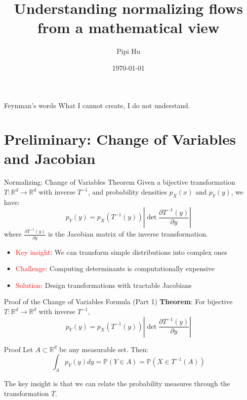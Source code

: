 \documentclass[aspectratio=169]{beamer}
\title[Understanding normalizing flows]{Understanding normalizing flows from a mathematical view}
\author{Pipi Hu}
\institute[BIMSA]{Beijing Institute of Mathematical Sciences and Applications}
\date{\today}
\begin{document}
  
  
\begin{frame}  
  \titlepage  
\end{frame}  

\begin{frame}{Feynman's words}
\centering
    What I cannot create, I do not understand.
\end{frame}
  

\section{Preliminary: Change of Variables and Jacobian}

\begin{frame}{Normalizing: Change of Variables Theorem}
Given a bijective transformation $T: \mathbb{R}^d \to \mathbb{R}^d$ with inverse $T^{-1}$, and probability densities $p_X(x)$ and $p_Y(y)$, we have:
\begin{equation}
    p_Y(y) = p_X(T^{-1}(y)) \left|\det \frac{\partial T^{-1}(y)}{\partial y}\right|
\end{equation}
where $\frac{\partial T^{-1}(y)}{\partial y}$ is the Jacobian matrix of the inverse transformation.

\begin{itemize}
    \item \textcolor{red}{Key insight}: We can transform simple distributions into complex ones
    \item \textcolor{red}{Challenge}: Computing determinants is computationally expensive
    \item \textcolor{red}{Solution}: Design transformations with tractable Jacobians
\end{itemize}
\end{frame}

\begin{frame}{Proof of the Change of Variables Formula (Part 1)}
\textbf{Theorem}: For bijective $T: \mathbb{R}^d \to \mathbb{R}^d$ with inverse $T^{-1}$,
\begin{equation}
    p_Y(y) = p_X(T^{-1}(y)) \left|\det \frac{\partial T^{-1}(y)}{\partial y}\right|
\end{equation}

\begin{block}{Proof}
Let $A \subset \mathbb{R}^d$ be any measurable set. Then:
\begin{equation}
    \int_A p_Y(y) dy = \mathbb{P}(Y \in A) = \mathbb{P}(X \in T^{-1}(A))
\end{equation}

The key insight is that we can relate the probability measures through the transformation $T$.
\end{block}
\end{frame}
\end{document}
